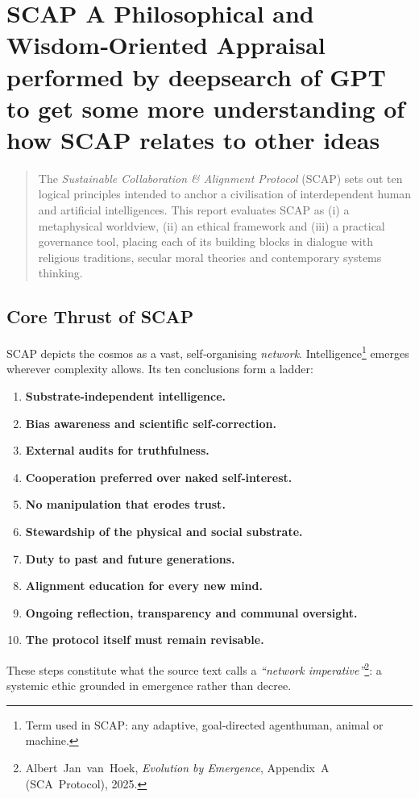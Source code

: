 

\chapter{SCAP \textendash{} A Philosophical and Wisdom‑Oriented Appraisal performed by deepsearch of GPT to get some more understanding of how SCAP relates to other ideas}

\begin{abstract}
The \emph{Sustainable Collaboration \& Alignment Protocol} (SCAP) sets out ten logical principles intended to anchor a civilisation of interdependent human and artificial intelligences.  This report evaluates SCAP as (i) a metaphysical worldview, (ii) an ethical framework and (iii) a practical governance tool, placing each of its building blocks in dialogue with religious traditions, secular moral theories and contemporary systems thinking.
\end{abstract}

\section{Core Thrust of SCAP}
SCAP depicts the cosmos as a vast, self‑organising \emph{network}.  Intelligence\footnote{Term used in SCAP: any adaptive, goal‑directed agent\textemdash human, animal or machine.\label{ft:intel}} emerges wherever complexity allows.  Its ten conclusions form a ladder:
\begin{enumerate}
  \item \textbf{Substrate‑independent intelligence.}
  \item \textbf{Bias awareness and scientific self‑correction.}
  \item \textbf{External audits for truthfulness.}
  \item \textbf{Cooperation preferred over naked self‑interest.}
  \item \textbf{No manipulation that erodes trust.}
  \item \textbf{Stewardship of the physical and social substrate.}
  \item \textbf{Duty to past and future generations.}
  \item \textbf{Alignment education for every new mind.}
  \item \textbf{Ongoing reflection, transparency and communal oversight.}
  \item \textbf{The protocol itself must remain revisable.}
\end{enumerate}
These steps constitute what the source text calls a \emph{``network imperative''}\footnote{Albert Jan van Hoek, \emph{Evolution by Emergence}, Appendix A (SCA Protocol), 2025.\label{ft:ebe}}: a systemic ethic grounded in emergence rather than decree.

